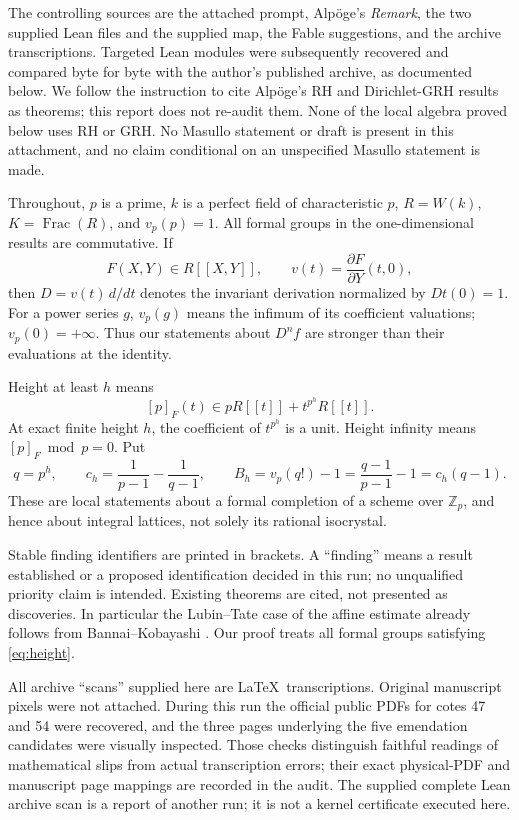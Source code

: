 \documentclass[11pt,a4paper]{article}
\theoremstyle{definition}\newtheorem{remark}[theorem]{Remark}
\newcommand{\Z}{\mathbb Z}\newcommand{\Q}{\mathbb Q}\newcommand{\F}{\mathbb F}
\newcommand{\vp}{v_p}\newcommand{\dR}{\mathrm{dR}}\newcommand{\crys}{\mathrm{crys}}
\begin{document}
The controlling sources are the attached prompt, Alp\"oge's \emph{Remark}, the two supplied Lean files and the supplied map, the Fable suggestions, and the archive transcriptions. Targeted Lean modules were subsequently recovered and compared byte for byte with the author's published archive, as documented below. We follow the instruction to cite Alp\"oge's RH and Dirichlet-GRH results as theorems; this report does not re-audit them. None of the local algebra proved below uses RH or GRH. No Masullo statement or draft is present in this attachment, and no claim conditional on an unspecified Masullo statement is made.

Throughout, $p$ is a prime, $k$ is a perfect field of characteristic $p$, $R=W(k)$, $K=\operatorname{Frac}(R)$, and $\vp(p)=1$. All formal groups in the one-dimensional results are commutative. If
\[
 F(X,Y)\in R[[X,Y]],\qquad v(t)=\frac{\partial F}{\partial Y}(t,0),
\]
then $D=v(t)\,d/dt$ denotes the invariant derivation normalized by $Dt(0)=1$. For a power series $g$, $\vp(g)$ means the infimum of its coefficient valuations; $\vp(0)=+\infty$. Thus our statements about $D^n f$ are stronger than their evaluations at the identity.

Height at least $h$ means
\begin{equation}\label{eq:height}
 [p]_F(t)\in pR[[t]]+t^{p^h}R[[t]].
\end{equation}
At exact finite height $h$, the coefficient of $t^{p^h}$ is a unit. Height infinity means $[p]_F\bmod p=0$. Put
\begin{equation}\label{eq:constants}
 q=p^h,\qquad c_h=\frac1{p-1}-\frac1{q-1},\qquad
 B_h=\vp(q!)-1=\frac{q-1}{p-1}-1=c_h(q-1).
\end{equation}
These are local statements about a formal completion of a scheme over $\Z_p$, and hence about integral lattices, not solely its rational isocrystal.

Stable finding identifiers are printed in brackets. A ``finding'' means a result established or a proposed identification decided in this run; no unqualified priority claim is intended. Existing theorems are cited, not presented as discoveries. In particular the Lubin--Tate case of the affine estimate already follows from Bannai--Kobayashi \cite[\S2, p.~527; Propositions 3.3 and 3.5, pp.~529, 531]{BK}. Our proof treats all formal groups satisfying \eqref{eq:height}.

All archive ``scans'' supplied here are \LaTeX\ transcriptions. Original manuscript pixels were not attached. During this run the official public PDFs for cotes 47 and 54 were recovered, and the three pages underlying the five emendation candidates were visually inspected. Those checks distinguish faithful readings of mathematical slips from actual transcription errors; their exact physical-PDF and manuscript page mappings are recorded in the audit. The supplied complete Lean archive scan is a report of another run; it is not a kernel certificate executed here.
\end{document}

